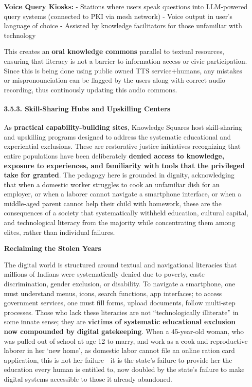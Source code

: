 \textbf{Voice Query Kiosks:} - Stations where users speak questions into
LLM-powered query systems (connected to PKI via mesh network) - Voice
output in user's language of choice - Assisted by knowledge facilitators
for those unfamiliar with technology

This creates an \textbf{oral knowledge commons} parallel to textual
resources, ensuring that literacy is not a barrier to information access
or civic participation. Since this is being done using public owned TTS
service+humans, any mistakes or mispronounciation can be flagged by the
users along with correct audio recording, thus continously updating this
audio commons.

\paragraph{3.5.3. Skill-Sharing Hubs and Upskilling
Centers}\label{skill-sharing-hubs-and-upskilling-centers}

As \textbf{practical capability-building sites}, Knowledge Squares host
skill-sharing and upskilling programs designed to address the systematic
educational and experiential exclusions. These are restorative justice
initiatives recognizing that entire populations have been deliberately
\textbf{denied access to knowledge, exposure to experiences, and
familiarity with tools that the privileged take for granted}. The
pedagogy here is grounded in dignity, acknowledging that when a domestic
worker struggles to cook an unfamiliar dish for an employer, or when a
laborer cannot navigate a smartphone interface, or when a middle-aged
parent cannot help their child with homework, these are the consequences
of a society that systematically withheld education, cultural capital,
and technological literacy from the majority while concentrating them
among elites, rather than individual failures.

\textbf{Reclaiming the Stolen Years}

The digital world is structured around textual and navigational
literacies that millions of Indians were systematically denied due to
poverty, caste discrimination, gender exclusion, or disability. To
navigate a smartphone, one must understand menus, icons, search
functions, app interfaces; to access government services, one must fill
forms, upload documents, follow multi-step processes. Those who lack
these literacies are not ``technologically illiterate'' in some innate
sense; they are \textbf{victims of systematic educational exclusion now
compounded by digital gatekeeping}. When a 45-year-old woman, who was
pulled out of school at age 12 to marry, and work as a cook and
reproductive laborer in her `new home', as domestic labor cannot file an
online ration card application, this is not her failure---it is the
state's failure to provide her the education every human is entitled to,
now doubled by the state's failure to make digital systems accessible to
those it already abandoned.

